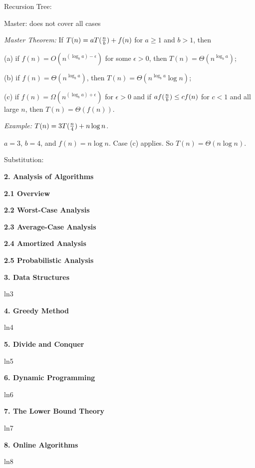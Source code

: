 \documentclass[8pt]{minimal}
\begin{document}
\begin{flushleft}
\begin{multicols}{3}
Recursion Tree:

Master: does not cover all cases

{\em Master Theorem:} If $T(n)=aT({n\over b})+f(n)$ for $a\ge1$ and $b>1$, then

(a) if $f(n)=O(n^{(\log_ba)-\epsilon})$ for some $\epsilon>0$, then
$T(n)=\Theta(n^{\log_ba})$;

(b) if $f(n)=\Theta(n^{\log_ba})$, then
$T(n)=\Theta(n^{\log_ba}\log n)$;

(c) if $f(n)=\Omega(n^{(\log_ba)+\epsilon})$ for $\epsilon>0$ and if
$af({n\over b})\le cf(n)$ for $c<1$ and all large $n$, then
$T(n)=\Theta(f(n))$.


{\em Example:} $T(n)=3T({n\over4})+n\log n$.

$a=3$, $b=4$, and $f(n)=n\log n$.
Case (c) applies. So $T(n)=\Theta(n\log n)$.

Substitution:


    \textbf{2. Analysis of Algorithms}

    \textbf{2.1 Overview}

    \textbf{2.2 Worst-Case Analysis}

    \textbf{2.3 Average-Case Analysis}

    \textbf{2.4 Amortized Analysis}

    \textbf{2.5 Probabilistic Analysis}


    \textbf{3. Data Structures}

    ln3


    \textbf{4. Greedy Method}

    ln4


    \textbf{5. Divide and Conquer}

    ln5


    \textbf{6. Dynamic Programming}

    ln6


    \textbf{7. The Lower Bound Theory}

    ln7


    \textbf{8. Online Algorithms}

    ln8
    

    \lipsum
    \lipsum

\end{multicols}
\end{flushleft}
\end{document}
